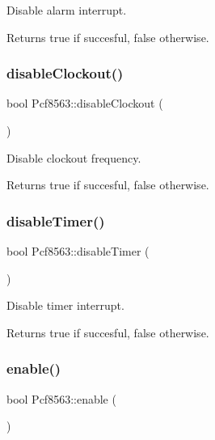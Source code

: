 Disable alarm interrupt. 

\begin{DoxyReturn}{Returns}
true if succesful, false otherwise. 
\end{DoxyReturn}
\mbox{\label{namespacePcf8563_a76c81b3e0f59f5e4e80dd8807c199856}} 
\subsubsection{\texorpdfstring{disable\+Clockout()}{disableClockout()}}
{\footnotesize\ttfamily bool Pcf8563\+::disable\+Clockout (\begin{DoxyParamCaption}{ }\end{DoxyParamCaption})}



Disable clockout frequency. 

\begin{DoxyReturn}{Returns}
true if succesful, false otherwise. 
\end{DoxyReturn}
\mbox{\label{namespacePcf8563_ac2c3ca7f3a13516c6549bfc0f6527c6a}} 
\subsubsection{\texorpdfstring{disable\+Timer()}{disableTimer()}}
{\footnotesize\ttfamily bool Pcf8563\+::disable\+Timer (\begin{DoxyParamCaption}{ }\end{DoxyParamCaption})}



Disable timer interrupt. 

\begin{DoxyReturn}{Returns}
true if succesful, false otherwise. 
\end{DoxyReturn}
\mbox{\label{namespacePcf8563_a32420d263d406b766b21bc00dccdc333}} 
\subsubsection{\texorpdfstring{enable()}{enable()}}
{\footnotesize\ttfamily bool Pcf8563\+::enable (\begin{DoxyParamCaption}{ }\end{DoxyParamCaption})}



